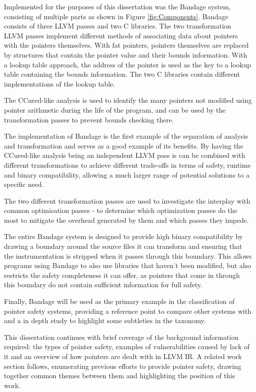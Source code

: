 \documentclass[a4paper,12pt,twoside,openright]{report}
\begin{document}
Implemented for the purposes of this dissertation was the Bandage system, consisting of multiple parts as shown in Figure \ref{fig:Components}.
Bandage consists of three LLVM passes and two C libraries.
The two transformation LLVM passes implement different methods of associating data about pointers with the pointers themselves.
With fat pointers, pointers themselves are replaced by structures that contain the pointer value and their bounds information.
With a lookup table approach, the address of the pointer is used as the key to a lookup table containing the bounds information.
The two C libraries contain different implementations of the lookup table.

The CCured-like analysis is used to identify the many pointers not modified using pointer arithmetic during the life of the program, and can be used by the transformation passes to prevent bounds checking there.

The implementation of Bandage is the first example of the separation of analysis and transformation and serves as a good example of its benefits.
By having the CCured-like analysis being an independent LLVM pass is can be combined with different transformations to achieve different trade-offs in terms of safety, runtime and binary compatibility, allowing a much larger range of potential solutions to a specific need.

The two different transformation passes are used to investigate the interplay with common optimisation passes - to determine which optimization passes do the most to mitigate the overhead generated by them and which passes they impede.

The entire Bandage system is designed to provide high binary compatibility by drawing a boundary around the source files it can transform and ensuring that the instrumentation is stripped when it passes through this boundary.
This allows programs using Bandage to also use libraries that haven't been modified, but also restricts the safety completeness it can offer, as pointers that come in through this boundary do not contain sufficient information for full safety.

Finally, Bandage will be used as the primary example in the classification of pointer safety systems, providing a reference point to compare other systems with and a in depth study to highlight some subtleties in the taxonomy.

This dissertation continues with brief coverage of the background information required: the types of pointer safety, examples of vulnerabilities caused by lack of it and an overview of how pointers are dealt with in LLVM IR.
A related work section follows, enumerating previous efforts to provide pointer safety, drawing together common themes between them and highlighting the position of this work.
\end{document}
